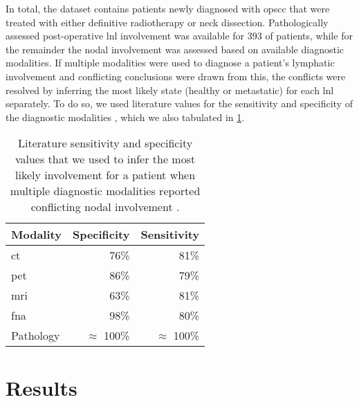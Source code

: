 \documentclass[twocolumn]{aastex631}
\begin{document}
In total, the dataset contains  patients newly diagnosed with \gls{opscc} that were treated with either definitive radiotherapy or neck dissection. Pathologically assessed post-operative \gls{lnl} involvement was available for 393 of patients, while for the remainder the nodal involvement was assessed based on available diagnostic modalities. If multiple modalities were used to diagnose a patient's lymphatic involvement and conflicting conclusions were drawn from this, the conflicts were resolved by inferring the most likely state (healthy or metastatic) for each \gls{lnl} separately. To do so, we used literature values for the sensitivity and specificity of the diagnostic modalities \cite{de_bondt_detection_2007,kyzas_18f-fluorodeoxyglucose_2008}, which we also tabulated in \cref{table:sens_spec}.


\begin{table}
\centering
    \begin{tabular}{|l|rr|}
        \hline
        \textbf{Modality} & \textbf{Specificity} & \textbf{Sensitivity} \\
        \hline
        \acrshort{ct} & 76\% & 81\% \\
        \acrshort{pet} & 86\% & 79\% \\
        \gls{mri} & 63\% & 81\% \\
        \acrshort{fna} & 98\% & 80\% \\
        Pathology & $\approx$ 100\% & $\approx$ 100\% \\
        \hline
    \end{tabular}
    \caption{Literature sensitivity and specificity values that we used to infer the most likely involvement for a patient when multiple diagnostic modalities reported conflicting nodal involvement \cite{de_bondt_detection_2007,kyzas_18f-fluorodeoxyglucose_2008}.}
    \label{table:sens_spec}
\end{table}



\section{Results}
\label{sec:results}

\begin{table}
    \centering
    \caption{Model comparison results from the base graph and the extended graph we chose as the ``winnning'' model. For both \glspl{dag} we show the log-evidence, computed via thermodynamic integration, the negative one half of the \gls{bic}, as well as the maximum log-likelihood that was encountered during the final \gls{mcmc} sampling round.}
    \label{table:evidence}
\end{table}
\end{document}
